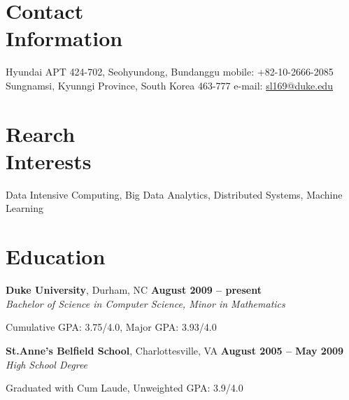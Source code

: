 \documentclass[11pt,margin,line]{cv}
\begin{document}
\begin{resume}

    \section{\mysidestyle Contact\\Information}
    Hyundai APT 424-702, Seohyundong, Bundanggu                   \hfill mobile: +82-10-2666-2085               \vspace{1mm}\\\vspace{0mm}%
    Sungnamsi, Kyunngi Province, South Korea 463-777          \hfill e-mail: \href{mailto:sl169@duke.edu}{sl169@duke.edu} \vspace{1mm}\\\vspace{-4.5mm}%
    \section{\mysidestyle Rearch\\Interests}
    Data Intensive Computing, Big Data Analytics, Distributed Systems, Machine Learning\vspace{1mm}

    \section{\mysidestyle Education}
    \textbf{Duke University}, Durham, NC \hfill \textbf{August 2009 -- present}\vspace{1mm}\\\vspace{0mm}%
    \textsl{Bachelor of Science in Computer Science, Minor in Mathematics}
    \vspace{-2mm}\\\vspace{-1mm}%
    \begin{list3}
        \item Cumulative GPA: 3.75/4.0, Major GPA: 3.93/4.0
    \end{list3}
    \textbf{St.Anne's Belfield School}, Charlottesville, VA \hfill \textbf{August 2005 -- May 2009}\vspace{1mm}\\\vspace{0mm}%
    \textsl{High School Degree}
    \vspace{-2mm}\\\vspace{-1mm}%
    \begin{list3}
        \item Graduated with Cum Laude, Unweighted GPA: 3.9/4.0
    \end{list3}


\end{resume}
\end{document}
